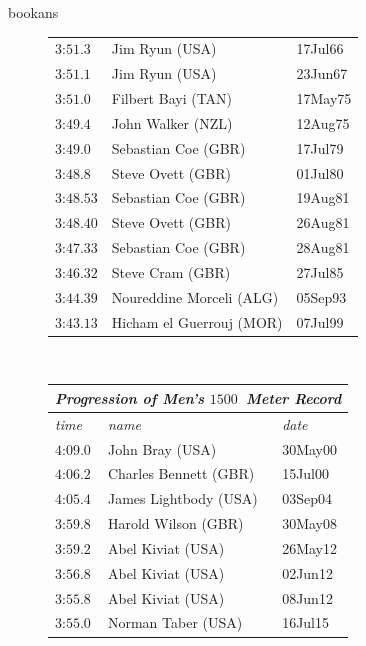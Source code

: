 \begin{exercises}
\begin{Filesave}{bookans}
\begin{figure}
{{\begin{tabular}[t]{|l|ll|}
           $\text{3:51}.3$      &Jim Ryun (USA)             &17Jul66 \\
           $\text{3:51}.1$      &Jim Ryun (USA)             &23Jun67 \\
           $\text{3:51}.0$      &Filbert Bayi (TAN)         &17May75 \\
           $\text{3:49}.4$      &John Walker (NZL)          &12Aug75 \\
           $\text{3:49}.0$      &Sebastian Coe (GBR)        &17Jul79 \\
           $\text{3:48}.8$      &Steve Ovett (GBR)          &01Jul80 \\
           $\text{3:48}.53$     &Sebastian Coe (GBR)        &19Aug81 \\
           $\text{3:48}.40$     &Steve Ovett (GBR)          &26Aug81 \\
           $\text{3:47}.33$     &Sebastian Coe (GBR)        &28Aug81 \\
           $\text{3:46}.32$     &Steve Cram (GBR)           &27Jul85 \\
           $\text{3:44}.39$     &Noureddine Morceli (ALG)   &05Sep93 \\
	   $\text{3:43}.13$     &Hicham el Guerrouj (MOR)   &07Jul99 \\
      \hline
      \end{tabular}
      \   %
        \begin{tabular}[t]{|l|ll|}
        \hline
          \multicolumn{3}{|c|}{\textit{Progression of Men's $1500$~Meter Record}}  \\
        \hline
        \textit{time}  &\textit{name}  &\textit{date}  \\
         \hline  
         $\text{4:09}.0$   &John Bray (USA)        &30May00  \\
         $\text{4:06}.2$   &Charles Bennett (GBR)  &15Jul00  \\
         $\text{4:05}.4$   &James Lightbody (USA)  &03Sep04  \\
         $\text{3:59}.8$   &Harold Wilson (GBR)    &30May08  \\
         $\text{3:59}.2$   &Abel Kiviat (USA)      &26May12  \\
         $\text{3:56}.8$   &Abel Kiviat (USA)      &02Jun12  \\
         $\text{3:55}.8$   &Abel Kiviat (USA)      &08Jun12  \\
         $\text{3:55}.0$   &Norman Taber (USA)     &16Jul15  \\

\end{tabular}}}
\end{figure}
\end{Filesave}
\end{exercises}
